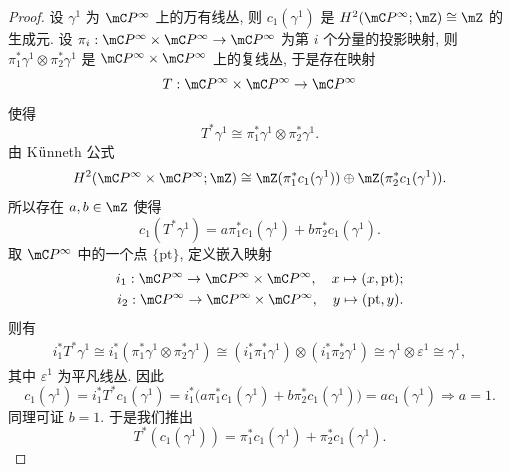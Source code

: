     \begin{proof}
         设 $\gamma^1$ 为 $\mC P^{\infty}$ 上的万有线丛, 则 $c_1(\gamma^1)$ 是 $H^2(\mC P^{\infty};\mZ)\cong\mZ$ 的生成元. 
        设 $\pi_i:\mC P^{\infty}\times\mC P^{\infty}\rightarrow\mC P^{\infty}$ 为第 $i$ 个分量的投影映射, 
        则 $\pi_1^*\gamma^1\otimes\pi_2^*\gamma^1$ 是 $\mC P^{\infty}\times\mC P^{\infty}$ 上的复线丛, 于是存在映射
        \begin{equation*}
            T:\mC P^{\infty}\times\mC P^{\infty}\rightarrow\mC P^{\infty}
        \end{equation*}
        使得 
        \begin{equation*}
            T^*\gamma^1 \cong \pi_1^*\gamma^1\otimes\pi_2^*\gamma^1.
        \end{equation*}
        由 K$\ddot{\rm u}$nneth 公式 
        \begin{equation*}
            H^2(\mC P^{\infty}\times\mC P^{\infty};\mZ)\cong \mZ(\pi_1^*c_1(\gamma^1))\oplus \mZ(\pi_2^*c_1(\gamma^1)).
        \end{equation*}
        所以存在 $a,b\in\mZ$ 使得
        \begin{equation*}
            c_1(T^*\gamma^1) = a\pi_1^*c_1(\gamma^1) + b\pi_2^*c_1(\gamma^1).
        \end{equation*}
        取 $\mC P^{\infty}$ 中的一个点 $\{\text{pt}\}$, 定义嵌入映射
        \begin{align*}
            i_1:\mC P^{\infty} \rightarrow \mC P^{\infty}\times\mC P^{\infty}, \quad x \mapsto (x,\text{pt}); \\
            i_2:\mC P^{\infty} \rightarrow \mC P^{\infty}\times\mC P^{\infty}, \quad y \mapsto (\text{pt},y).
        \end{align*}
        则有
        \begin{align*}
            i_1^*T^*\gamma^1 \cong i_1^*(\pi_1^*\gamma^1\otimes\pi_2^*\gamma^1) \cong (i_1^*\pi_1^*\gamma^1)\otimes(i_1^*\pi_2^*\gamma^1)
            \cong \gamma^1\otimes\varepsilon^1 \cong \gamma^1,
        \end{align*}
        其中 $\varepsilon^1$ 为平凡线丛. 因此
        \begin{equation*}
            c_1(\gamma^1) = i_1^*T^*c_1(\gamma^1) = i_1^* \bigl(a \pi_1^*c_1(\gamma^1) + b \pi_2^*c_1(\gamma^1)\bigr) = a c_1(\gamma^1)\Rightarrow a=1.
        \end{equation*}
        同理可证 $b = 1$. 于是我们推出 
        \begin{equation*}
            T^*(c_1(\gamma^1)) = \pi_1^*c_1(\gamma^1) + \pi_2^*c_1(\gamma^1).
        \end{equation*}


\end{proof}
